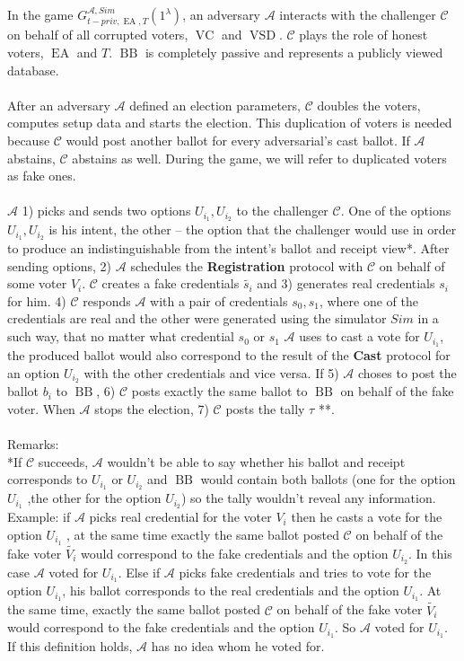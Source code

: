 \documentclass[12pt]{article}
\DeclareMathOperator{\vsd}{VSD}
\DeclareMathOperator{\ea}{EA}
\DeclareMathOperator{\bb}{BB}
\DeclareMathOperator{\voc}{VC}
\begin{document}
In the game $G_{t-priv,\ea,T}^{\mathcal{A}, Sim}(1^{\lambda})$, an adversary $\mathcal{A}$ interacts with the challenger $\mathcal{C}$ on behalf of all corrupted voters, $\voc$ and $\vsd$. $\mathcal{C}$ plays the role of honest voters, $\ea$ and $T$. $\bb$ is completely passive and represents a publicly viewed database. \\\\
After an adversary  $\mathcal{A}$  defined an election parameters, $\mathcal{C}$  doubles the voters, computes setup data and starts the election. This duplication of voters is needed because $\mathcal{C}$ would post another ballot for every adversarial's cast ballot. If $\mathcal{A}$ abstains, $\mathcal{C}$ abstains as well. During the game, we will refer to duplicated voters as fake ones. \\\\
$\mathcal{A}$ 1) picks and sends two options $U_{i_1},U_{i_2}$ to the challenger $\mathcal{C}$. One of the options $U_{i_1}, U_{i_2}$ is his intent, the other -- the option that the challenger would use in order to produce an indistinguishable from the intent's ballot and receipt view*. After sending options, 2) $\mathcal{A}$ schedules the   \textbf{Registration} protocol with $\mathcal{C}$ on behalf of some voter $V_i$. $\mathcal{C}$ creates a fake credentials $\tilde{s_i}$ and 3) generates real credentials $s_i$ for him. 4) $\mathcal{C}$ responds $\mathcal{A}$ with a pair of credentials $s_0,s_1$, where one of the credentials are real and the other were generated using the simulator $Sim$ in a such way, that no matter what credential $s_0$ or $s_1$ $\mathcal{A}$ uses to cast a vote for $U_{i_1}$, the produced ballot would also correspond to the result of the \textbf{Cast} protocol for an option $U_{i_2}$ with the other credentials and vice versa. If 5) $\mathcal{A}$ choses to post the ballot $b_i$ to $\bb$, 6) $\mathcal{C}$  posts exactly the same ballot to $\bb$ on behalf of the fake voter. When $\mathcal{A}$ stops the election, 7) $\mathcal{C}$ posts the tally $\tau$ **. \\\\
Remarks:\\
*If  $\mathcal{C}$ succeeds, $\mathcal{A}$ wouldn't be able to say whether his ballot and receipt corresponds to $U_{i_1}$ or $U_{i_2}$ and $\bb$ would contain both ballots (one for the option $U_{i_1}$ ,the other for the option $ U_{i_2}$) so the tally wouldn't reveal any information. Example: if $\mathcal{A}$  picks real credential for the voter $V_i$ then he casts a vote for the option  $U_{i_1}$ , at the same time exactly the same ballot posted $\mathcal{C}$ on behalf of the fake voter $\tilde{V_i}$ would correspond to the fake credentials and the option $U_{i_2}$. In this case $\mathcal{A}$  voted for $U_{i_1}$. Else if $\mathcal{A}$ picks fake credentials and tries to vote for the option $U_{i_1}$,  his ballot corresponds to the real credentials and  the option $U_{i_1}$. At the same time, exactly the same ballot posted $\mathcal{C}$ on behalf of the fake voter $\tilde{V_i}$ would correspond to the fake credentials  and the option $U_{i_1}$. So $\mathcal{A}$  voted for $U_{i_1}$. If this definition holds,  $\mathcal{A}$ has no idea whom he voted for. \\
\end{document}
